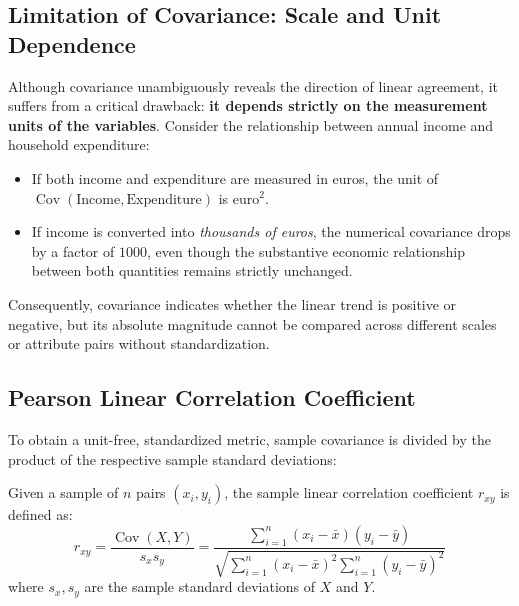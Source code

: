 \subsection{Limitation of Covariance: Scale and Unit Dependence}
Although covariance unambiguously reveals the direction of linear agreement, it suffers from a critical drawback: \textbf{it depends strictly on the measurement units of the variables}.
Consider the relationship between annual income and household expenditure:
\begin{itemize}
    \item If both income and expenditure are measured in euros, the unit of $\operatorname{Cov}(\text{Income}, \text{Expenditure})$ is $\text{euro}^2$.
    \item If income is converted into \textit{thousands of euros}, the numerical covariance drops by a factor of $1000$, even though the substantive economic relationship between both quantities remains strictly unchanged.
\end{itemize}
Consequently, covariance indicates whether the linear trend is positive or negative, but its absolute magnitude cannot be compared across different scales or attribute pairs without standardization.

\subsection{Pearson Linear Correlation Coefficient}
To obtain a unit-free, standardized metric, sample covariance is divided by the product of the respective sample standard deviations:

\begin{definition}
Given a sample of $n$ pairs $(x_i, y_i)$, the sample linear correlation coefficient $r_{xy}$ is defined as:
\begin{equation}
r_{xy} = \frac{\operatorname{Cov}(X, Y)}{s_x s_y} = \frac{\sum_{i=1}^n (x_i - \bar{x})(y_i - \bar{y})}{\sqrt{\sum_{i=1}^n (x_i - \bar{x})^2 \sum_{i=1}^n (y_i - \bar{y})^2}}
\end{equation}
where $s_x, s_y$ are the sample standard deviations of $X$ and $Y$.
\end{definition}

